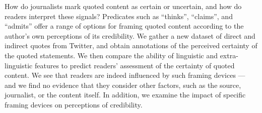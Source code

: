 How do journalists mark quoted content as certain or uncertain, and how do readers interpret these signals? Predicates such as ``thinks'', ``claims'', and ``admits'' offer a range of options for framing quoted content according to the author's own perceptions of its credibility. We gather a new dataset of direct and indirect quotes from Twitter, and obtain annotations of the perceived certainty of the quoted statements. We then compare the ability of linguistic and extra-linguistic features to predict readers' assessment of the certainty of quoted content. We see that readers are indeed influenced by such framing devices --- and we find no evidence that they consider other factors, such as the source, journalist, or the content itself. In addition, we examine the impact of specific framing devices on perceptions of credibility.
